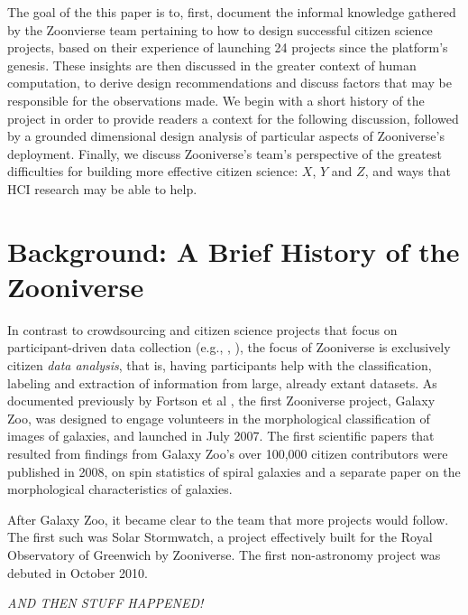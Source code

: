 \documentclass{sigchi}
\begin{document}
The goal of the this paper is to, first, document the informal knowledge gathered by the Zoonvierse team pertaining to how to design successful citizen science projects, based on their experience of launching 24 projects since the platform's genesis.  These insights are then discussed in the greater context of human computation, to derive design recommendations and discuss factors that may be responsible for the observations made. We begin with a short history of the project in order to provide readers a context for the following discussion, followed by a grounded dimensional design analysis of particular aspects of Zooniverse's deployment.  Finally, we discuss Zooniverse's team's perspective of the greatest difficulties for building more effective citizen science: $X$, $Y$ and $Z$, and ways that HCI research may be able to help.

\section{Background: A Brief History of the Zooniverse}


In contrast to crowdsourcing and citizen science projects that focus on participant-driven data collection (e.g., \cite{okolloh2009ushahidi}, \cite{zook2010volunteered}), the focus of Zooniverse is exclusively citizen \emph{data analysis}, that is, having participants help with the classification, labeling and extraction of information from large, already extant datasets. As documented previously by Fortson et al \cite{fortson2011galaxy}, the first Zooniverse project, Galaxy Zoo, was designed to engage volunteers in the morphological classification of images of galaxies, and launched in July 2007\cite{galaxyzoo-launch}.  The first scientific papers that resulted from findings from Galaxy Zoo's over 100,000 citizen contributors were published in 2008, on spin statistics of spiral galaxies\cite{land2008galaxy} and a separate paper on the morphological characteristics of galaxies\cite{lintott2008galaxy}.

After Galaxy Zoo, it became clear to the team that more projects would follow.  The first such was Solar Stormwatch, a project effectively built for the Royal Observatory of Greenwich by Zooniverse.  The first non-astronomy project was debuted in October 2010.

\emph{AND THEN STUFF HAPPENED!} 
\end{document}
